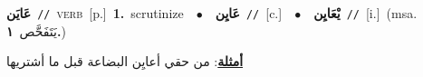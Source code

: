 \documentclass[10pt,a4paper,twoside]{article} %
\begin{document}
\begin{multicols}{2}
{\setlength\topsep{0pt}\textbf{\foreignlanguage{arabic}{عَايَن}}\ {\color{gray}\texttt{//}\color{black}}\ \textsc{verb}\ [p.]\ \textbf{1.}~scrutinize\ \ $\bullet$\ \ \setlength\topsep{0pt}\textbf{\foreignlanguage{arabic}{عَايِن}}\ {\color{gray}\texttt{//}\color{black}}\ [c.]\ \ $\bullet$\ \ \setlength\topsep{0pt}\textbf{\foreignlanguage{arabic}{يْعَايِن}}\ {\color{gray}\texttt{//}\color{black}}\ [i.]\ \color{gray}(msa. \foreignlanguage{arabic}{يَتَفَحَّص}~\foreignlanguage{arabic}{\textbf{١.}})\color{black}\  \begin{flushright}\color{gray}\foreignlanguage{arabic}{\textbf{\underline{\foreignlanguage{arabic}{أمثلة}}}: من حقي أعايِن البضاعة قبل ما أشتريها}\end{flushright}\color{black}} \vspace{2mm}


\end{multicols}
\end{document}
